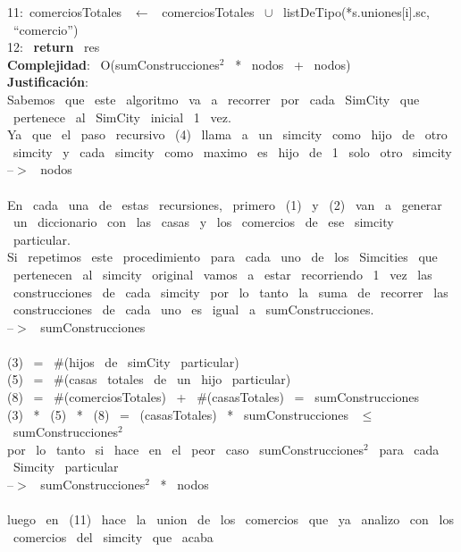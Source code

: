 \begin{Algoritmos}
    11:\indent  \ comerciosTotales \ $\leftarrow$ \ comerciosTotales \ $\cup$ \ listDeTipo(*s.uniones[i].sc, \ ``comercio'')\\
    12: \ \textbf{return} \ res\\
    \textbf{Complejidad}: \ O(sumConstrucciones$^2$ \ * \ nodos \ + \ nodos)\\
    \textbf{Justificaci\'on}: \ \\
    Sabemos \ que \ este \ algoritmo \ va \ a \ recorrer \ por \ cada \ SimCity \ que \ pertenece \ al \ SimCity \ inicial \ 1 \ vez. \ \\
    Ya \ que \ el \ paso \ recursivo \ (4) \ llama \ a \ un \ simcity \ como \ hijo \ de \ otro \ simcity \ y \ cada \ simcity \ como \
    maximo \ es \ hijo \ de \ 1 \ solo \ otro \ simcity\\
    --$>$ \ nodos\\
    \\
    En \ cada \ una \ de \ estas \ recursiones, \ primero \ (1) \ y \ (2) \ van \ a \ generar \ un \ diccionario \ con \ las \ casas \
    y \ los \ comercios \ de \ ese \ simcity \ particular.\\
    Si \ repetimos \ este \ procedimiento \ para \ cada \ uno \ de \ los \ Simcities \ que \ pertenecen \ al \ simcity \ original \ 
    vamos \ a \ estar \ recorriendo \ 1 \ vez \ las \ construcciones \ de \ cada \ simcity \ por \ lo \ tanto \ la \ suma \ de \ recorrer \ 
    las \ construcciones \ de \ cada \ uno \ es \ igual \ a \ sumConstrucciones.\\
    --$>$ \ sumConstrucciones\\
    \\
    (3) \ = \ $ \# $(hijos \ de \ simCity \ particular)\\
    (5) \ = \ $ \# $(casas \ totales \ de \ un \ hijo \ particular)\\
    (8) \ = \ $ \# $(comerciosTotales) \ + \ $ \# $(casasTotales) \ = \ sumConstrucciones\\
    (3) \ * \ (5) \ * \ (8) \ = \ (casasTotales) \ * \ sumConstrucciones \ $\leq$ \ sumConstrucciones$^2$\\
    por \ lo \ tanto \ si \ hace \ en \ el \ peor \ caso \ sumConstrucciones$^2$ \ para \ cada \ Simcity \ particular \ \\
    --$>$ \ sumConstrucciones$^2$ \ * \ nodos\\
    \\
    luego \ en \ (11) \ hace \ la \ union \ de \ los \ comercios \ que \ ya \ analizo \ con \ los \ comercios \ del \ simcity \ que \ acaba \

\end{Algoritmos}
